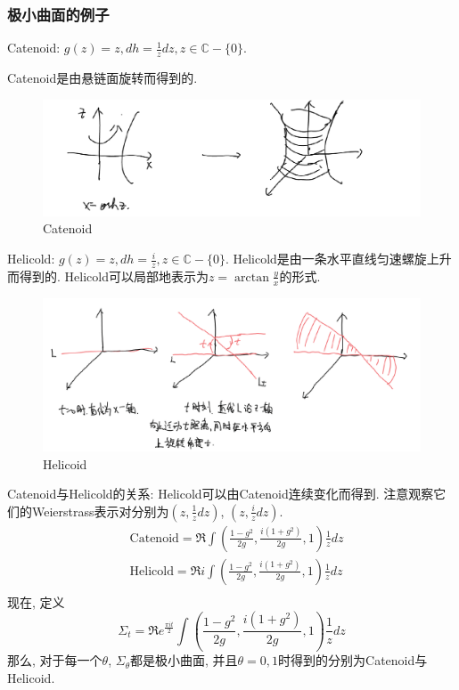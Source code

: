 \subsubsection{极小曲面的例子}
Catenoid: $g(z)=z, dh=\frac{1}{z}dz, z \in \mathbb{C}-\{0\}$.  
\par Catenoid是由悬链面旋转而得到的.

\begin{figure}[ht]
	\centering
	\includegraphics[scale=0.5]{images/catenoid.png}
	\caption{Catenoid}
	\label{catenoidp}
\end{figure}


Helicold: $g(z)=z, dh= \frac{i}{z}, z \in \mathbb{C}-\{0\}$.
Helicold是由一条水平直线匀速螺旋上升而得到的. Helicold可以局部地表示为$z=\arctan\frac{y}{x}$的形式.

\begin{figure}[ht]
	\centering
	\includegraphics[scale=0.5]{images/helicoid.png}
	\caption{Helicoid}
	\label{helicoidp}
\end{figure}
\par Catenoid与Helicold的关系: Helicold可以由Catenoid连续变化而得到. 注意观察它们的Weierstrass表示对分别为$(z,\frac{1}{z}dz)$, $(z,\frac{i}{z}dz)$.
\begin{align}
    &\text{Catenoid}= \Re \int (\frac{1-g^2}{2g}, \frac{i(1+g^2)}{2g},1)\frac{1}{z}dz \\
    &\text{Helicold}= \Re i \int (\frac{1-g^2}{2g}, \frac{i(1+g^2)}{2g},1)\frac{1}{z}dz \\
\end{align}
现在, 定义
\begin{equation}
    \Sigma_t= \Re e^{\frac{\pi it}{2}} \int (\frac{1-g^2}{2g}, \frac{i(1+g^2)}{2g},1)\frac{1}{z}dz 
\end{equation}
那么, 对于每一个$\theta$, $\Sigma_\theta$都是极小曲面, 并且$\theta=0,1$时得到的分别为Catenoid与Helicoid.
